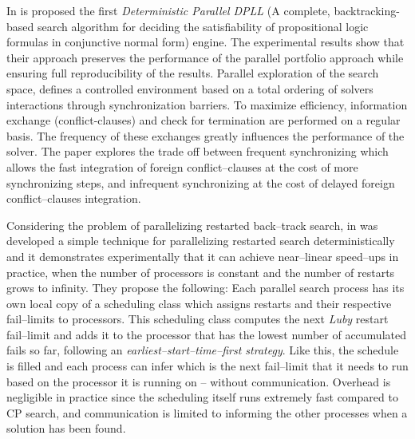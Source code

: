 In \cite{Hamadi2011} is proposed the first {\it Deterministic Parallel DPLL} (A complete,  backtracking-based search algorithm for deciding the satisfiability of propositional logic formulas in conjunctive normal form) engine. The experimental results show that their approach preserves the performance of the parallel portfolio approach while ensuring full reproducibility of the results. Parallel exploration of the search space, defines a controlled environment based on a total ordering of solvers interactions through synchronization barriers. To maximize efficiency, information exchange (conflict-clauses) and check for termination are performed on a regular basis. The frequency of these exchanges greatly influences the performance of the solver. The paper explores the trade off between frequent synchronizing which allows the fast integration of foreign conflict--clauses at the cost of more synchronizing steps, and infrequent synchronizing at the cost of delayed foreign conflict--clauses integration.

Considering the problem of parallelizing restarted back--track search, in \cite{Cire2011} was developed a simple technique for parallelizing restarted search deterministically and it demonstrates experimentally that it can achieve near--linear speed--ups in practice, when the number of processors is constant and the number of restarts grows to infinity. They propose the following: Each parallel search process has its own local copy of a scheduling class which assigns restarts and their respective fail--limits to processors. This scheduling class computes the next {\it Luby} restart fail--limit and adds it to the processor that has the lowest number of accumulated fails so far, following an {\it earliest--start--time--first strategy}. Like this, the schedule is filled and each process can infer which is the next fail--limit that it needs to run based on the processor it is running on -- without communication. Overhead is negligible in practice since the scheduling itself runs extremely fast compared to CP search, and communication is limited to informing the other processes when a solution has been found.

